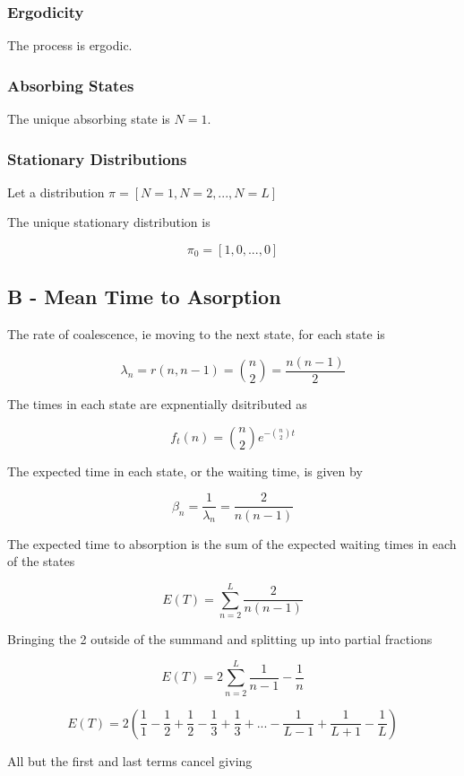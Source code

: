 \documentclass{article}
\begin{document}
\subsubsection{Ergodicity}

The process is ergodic.

\subsubsection{Absorbing States}

The unique absorbing state is $N = 1$.

\subsubsection{Stationary Distributions}

Let a distribution $\pi = [N=1, N=2,... ,N=L]$

The unique stationary distribution is 

$$\pi_0 = [1,0,...,0]$$


\subsection{B - Mean Time to Asorption}

The rate of coalescence, ie moving to the next state, for each state is

$$\lambda_n = r(n,n-1) = {n\choose 2} = \frac{n(n-1)}{2}$$

The times in each state are expnentially dsitributed as

$$f_t(n) = {n \choose 2} e^{-{n \choose 2}t}$$

The expected time in each state, or the waiting time, is given by 

$$\beta_n = \dfrac{1}{\lambda_n} = \frac{2}{n(n-1)}$$

The expected time to absorption is the sum of the expected waiting times in each of the states

$$E(T) = \sum_{n=2}^L\frac{2}{n(n-1)}$$

Bringing the 2 outside of the summand and splitting up into partial fractions

$$E(T) = 2\sum_{n=2}^L\frac{1}{n-1} - \frac{1}{n}$$


$$E(T) = 2(\frac{1}{1}-\frac{1}{2}+\frac{1}{2}-\frac{1}{3} + \frac{1}{3} + ... - \frac{1}{L-1} + \frac{1}{L+1} - \frac{1}{L})$$

All but the first and last terms cancel giving
\end{document}
